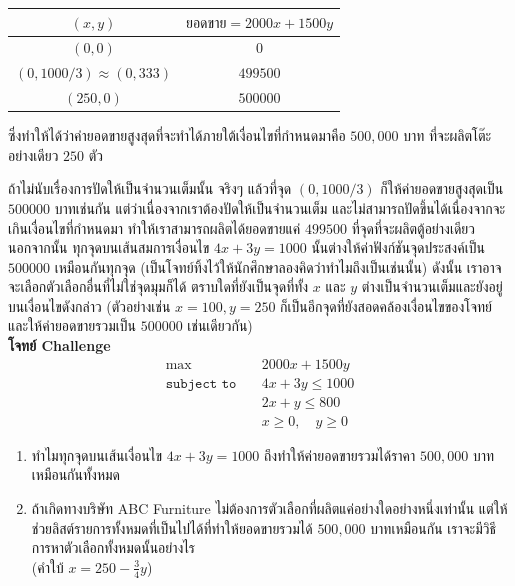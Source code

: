\begin{enumerate}
\begin{solution}
        \begin{center}
            \begin{tabular}{c|c}
                $(x,y)$ & $\text{ยอดขาย} = 2000x + 1500y$ \\
                \hline
                $(0,0)$ & 0 \\
                \hline
                $(0,1000/3)\approx(0,333)$ & $499500$ \\
                \hline
                $(250,0)$ & $500000$ \\
                \hline
            \end{tabular}
        \end{center}
        ซึ่งทำให้ได้ว่าค่ายอดขายสูงสุดที่จะทำได้ภายใต้เงื่อนไขที่กำหนดมาคือ $500,000$ บาท ที่จะผลิตโต๊ะอย่างเดียว $250$ ตัว
        \begin{remark}
            {}{}
            ถ้าไม่นับเรื่องการปัดให้เป็นจำนวนเต็มนั้น จริงๆ แล้วที่จุด $(0,1000/3)$ ก็ให้ค่ายอดขายสูงสุดเป็น $500000$ บาทเช่นกัน แต่ว่าเนื่องจากเราต้องปัดให้เป็นจำนวนเต็ม และไม่สามารถปัดขึ้นได้เนื่องจากจะเกินเงื่อนไขที่กำหนดมา ทำให้เราสามารถผลิตได้ยอดขายแค่ $499500$ ที่จุดที่จะผลิตตู้อย่างเดียว\\
    
            นอกจากนั้น ทุกจุดบนเส้นสมการเงื่อนไข $4x+3y=1000$ นั้นต่างให้ค่าฟังก์ชันจุดประสงค์เป็น $500000$ เหมือนกันทุกจุด (เป็นโจทย์ทิ้งไว้ให้นักศึกษาลองคิดว่าทำไมถึงเป็นเช่นนั้น) ดังนั้น เราอาจจะเลือกตัวเลือกอื่นที่ไม่ใช่จุดมุมก็ได้ ตราบใดที่ยังเป็นจุดที่ทั้ง $x$ และ $y$ ต่างเป็นจำนวนเต็มและยังอยู่บนเงื่อนไขดังกล่าว (ตัวอย่างเช่น $x = 100, y=250$ ก็เป็นอีกจุดที่ยังสอดคล้องเงื่อนไขของโจทย์และให้ค่ายอดขายรวมเป็น $500000$ เช่นเดียวกัน)\\
    
            \textbf{โจทย์ Challenge}
            \begin{align*}
                \max \quad & 2000x + 1500y \\
                \texttt{subject to} \quad
                & 4x + 3y \leq 1000 \\
                & 2x + y \leq 800 \\
                & x \geq 0, \quad y \geq 0 
            \end{align*}
            \begin{enumerate}
                \item ทำไมทุกจุดบนเส้นเงื่อนไข $4x + 3y = 1000$ ถึงทำให้ค่ายอดขายรวมได้ราคา $500,000$ บาทเหมือนกันทั้งหมด
                \item ถ้าเกิดทางบริษัท ABC Furniture ไม่ต้องการตัวเลือกที่ผลิตแค่อย่างใดอย่างหนึ่งเท่านั้น แต่ให้ช่วยลิสต์รายการทั้งหมดที่เป็นไปได้ที่ทำให้ยอดขายรวมได้ $500,000$ บาทเหมือนกัน เราจะมีวิธีการหาตัวเลือกทั้งหมดนั้นอย่างไร\\
                (คำใบ้ $x = 250 - \frac{3}{4}y$)
            \end{enumerate}
        \end{remark}
    \end{solution}
    

\end{enumerate}
